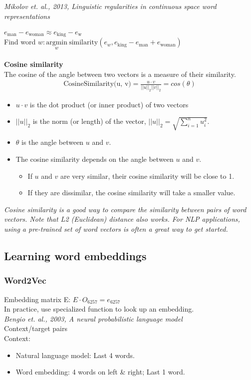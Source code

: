 \textit{Mikolov et. al., 2013, Linguistic regularities in continuous space word representations}\\
\\
$\displaystyle e_{\text{man}} - e_{\text{woman}} \approx e_{\text{king}} - e_{\text{w}}$\\
Find word $\displaystyle w: \underset{w}{\mathrm{argmin}} ~ \text{similarity}(e_w, e_{\text{king}} - e_{\text{man}} + e_{\text{woman}})$\\
\\
\textbf{Cosine similarity}\\
The cosine of the angle between two vectors is a measure of their similarity.
\begin{align}
\text{CosineSimilarity(u, v)} = \frac {u \cdot v} {||u||_2 ||v||_2} = cos(\theta)
\end{align}
\begin{itemize}
\item
    $u \cdot v$ is the dot product (or inner product) of two vectors
\item
    $||u||_2$ is the norm (or length) of the vector, $ ||u||_2 = \sqrt{\sum_{i=1}^{n} u_i^2}$.
\item
    $\theta$ is the angle between $u$ and $v$. 
\item
    The cosine similarity depends on the angle between $u$ and $v$. 
    \begin{itemize}
    \item
    If $u$ and $v$ are very similar, their cosine similarity will be close to 1.
    \item
     If they are dissimilar, the cosine similarity will take a smaller value.
    \end{itemize}
\end{itemize}

\emph{\textcolor{Bittersweet}{Cosine similarity is a good way to compare the similarity between pairs of word vectors. Note that L2 (Euclidean) distance also works. For NLP applications, using a pre-trained set of word vectors is often a great way to get started.}}
    
%
\subsection{Learning word embeddings}
\subsubsection{Word2Vec}
Embedding matrix E: $E \cdot O_{6257}= e_{6257}$\\
In practice, use specialized function to look up an embedding.\\
\textit{Bengio et. al., 2003, A neural probabilistic language model}\\
Context/target pairs\\
Context:
\begin{itemize}
\item
Natural language model: Last 4 words.
\item
Word embedding: 4 words on left \& right; Last 1 word.
\end{itemize}

